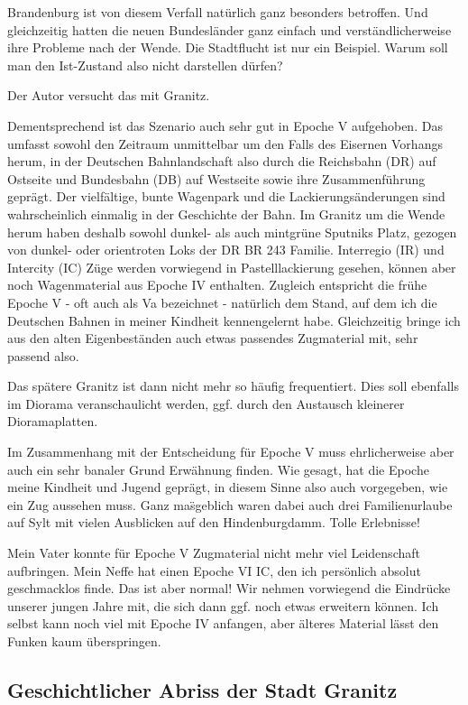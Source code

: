 Brandenburg ist von diesem Verfall nat\"urlich ganz besonders betroffen.
Und gleichzeitig hatten die neuen Bundesl\"ander ganz einfach und verst\"andlicherweise ihre Probleme nach der Wende.
Die Stadtflucht ist nur ein Beispiel.
Warum soll man den Ist-Zustand also nicht darstellen d\"urfen?

Der Autor versucht das mit Granitz.

Dementsprechend ist das Szenario auch sehr gut in Epoche V aufgehoben.
Das umfasst sowohl den Zeitraum unmittelbar um den Falls des Eisernen Vorhangs herum, in der Deutschen Bahnlandschaft also durch die Reichsbahn (DR) auf Ostseite und Bundesbahn (DB) auf Westseite sowie ihre Zusammenf\"uhrung gepr\"agt.
Der vielf\"altige, bunte Wagenpark und die Lackierungs\"anderungen sind wahrscheinlich einmalig in der Geschichte der Bahn.
Im Granitz um die Wende herum haben deshalb sowohl dunkel- als auch mintgr\"une Sputniks Platz, gezogen von dunkel- oder orientroten Loks der DR BR 243 Familie.
Interregio (IR) und Intercity (IC) Z\"uge werden vorwiegend in Pastelllackierung gesehen, k\"onnen aber noch Wagenmaterial aus Epoche IV enthalten.
Zugleich entspricht die fr\"uhe Epoche V - oft auch als Va bezeichnet - nat\"urlich dem Stand, auf dem ich die Deutschen Bahnen in meiner Kindheit kennengelernt habe.
Gleichzeitig bringe ich aus den alten Eigenbest\"anden auch etwas passendes Zugmaterial mit, sehr passend also.

Das sp\"atere Granitz ist dann nicht mehr so h\"aufig frequentiert.
Dies soll ebenfalls im Diorama veranschaulicht werden, ggf. durch den Austausch kleinerer Dioramaplatten.

Im Zusammenhang mit der Entscheidung f\"ur Epoche V muss ehrlicherweise aber auch ein sehr banaler Grund Erw\"ahnung finden.
Wie gesagt, hat die Epoche meine Kindheit und Jugend gepr\"agt, in diesem Sinne also auch vorgegeben, wie ein Zug aussehen muss.
Ganz ma\"sgeblich waren dabei auch drei Familienurlaube auf Sylt mit vielen Ausblicken auf den Hindenburgdamm.
Tolle Erlebnisse!

Mein Vater konnte f\"ur Epoche V Zugmaterial nicht mehr viel Leidenschaft aufbringen.
Mein Neffe hat einen Epoche VI IC, den ich pers\"onlich absolut geschmacklos finde.
Das ist aber normal!
Wir nehmen vorwiegend die Eindr\"ucke unserer jungen Jahre mit, die sich dann ggf. noch etwas erweitern k\"onnen.
Ich selbst kann noch viel mit Epoche IV anfangen, aber \"alteres Material l\"asst den Funken kaum \"uberspringen.


\subsection{Geschichtlicher Abriss der Stadt Granitz}
\label{sec:storyOfGranitz}

